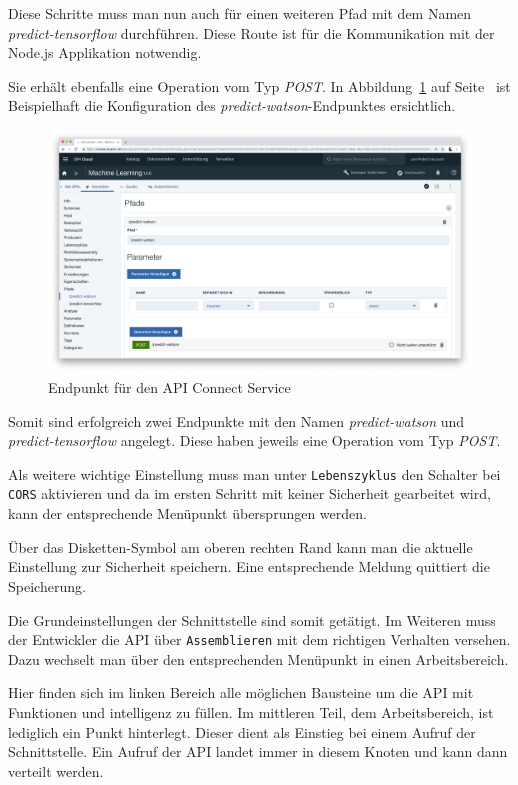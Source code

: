 Diese Schritte muss man nun auch für einen weiteren Pfad mit dem Namen \textit{predict-tensorflow} durchführen. Diese
Route ist für die Kommunikation mit der Node.js Applikation notwendig.

Sie erhält ebenfalls eine Operation vom Typ \textit{POST}. In Abbildung~\ref{fig:umsetzung_apiconnect_endpoint} auf
Seite~\pageref{fig:umsetzung_apiconnect_endpoint} ist Beispielhaft die Konfiguration des
\textit{predict-watson}-Endpunktes ersichtlich.

\begin{figure}[h]
    \centering
    \includegraphics[width=\textwidth]{images/kapitel_3/apiconnect_endpoint.png}
    \caption{Endpunkt für den API Connect Service}
    \label{fig:umsetzung_apiconnect_endpoint}
\end{figure}

Somit sind erfolgreich zwei Endpunkte mit den Namen \textit{predict-watson} und \textit{predict-tensorflow} angelegt.
Diese haben jeweils eine Operation vom Typ \textit{POST}.

Als weitere wichtige Einstellung muss man unter \texttt{Lebenszyklus} den Schalter bei \texttt{CORS} aktivieren und da
im ersten Schritt mit keiner Sicherheit gearbeitet wird, kann der entsprechende Menüpunkt übersprungen werden.

Über das Disketten-Symbol am oberen rechten Rand kann man die aktuelle Einstellung zur Sicherheit speichern. Eine
entsprechende Meldung quittiert die Speicherung.

Die Grundeinstellungen der Schnittstelle sind somit getätigt. Im Weiteren muss der Entwickler die API über
\texttt{Assemblieren} mit dem richtigen Verhalten versehen. Dazu wechselt man über den entsprechenden Menüpunkt in einen
Arbeitsbereich.

Hier finden sich im linken Bereich alle möglichen Bausteine um die API mit Funktionen und intelligenz zu füllen. Im
mittleren Teil, dem Arbeitsbereich, ist lediglich ein Punkt hinterlegt. Dieser dient als Einstieg bei einem Aufruf der
Schnittstelle. Ein Aufruf der API landet immer in diesem Knoten und kann dann verteilt werden.

